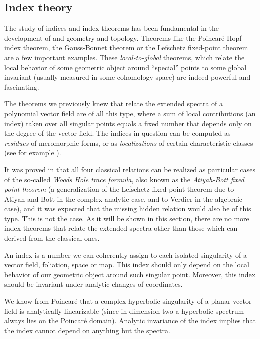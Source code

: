\documentclass[phd,tocprelim]{cornell}
\begin{document}
\subsection{Index theory}\label{subsec:indexTheory}

The study of indices and index theorems has been fundamental in the development of and geometry and topology. Theorems like the Poincar\'{e}-Hopf index theorem, the Gauss-Bonnet theorem or the Lefschetz fixed-point theorem are a few important examples. These \textit{local-to-global} theorems, which relate the local behavior of some geometric object around ``special'' points to some global invariant (usually measured in some cohomology space) are indeed powerful and fascinating.

The theorems we previously knew that relate the extended spectra of a polynomial vector field are of all this type, where a sum of local contributions (an index) taken over all singular points equals a fixed number that depends only on the degree of the vector field. The indices in question can be computed as \textit{residues} of meromorphic forms, or as \textit{localizations} of certain characteristic classes (see for example \cite{Suwa1998}).

It was proved in \cite{WoodsHole} that all four classical relations can be realized as particular cases of the so-called \textit{Woods Hole trace formula}, also known as the \textit{Atiyah-Bott fixed point theorem} (a generalization of the Lefschetz fixed point theorem due to Atiyah and Bott in the complex analytic case, and to Verdier in the algebraic case), and it was expected that the missing hidden relation would also be of this type. This is not the case. As it will be shown in this section, there are no more index theorems that relate the extended spectra other than those which can derived from the classical ones.

An index is a number we can coherently assign to each isolated singularity of a vector field, foliation, space or map. This index should only depend on the local behavior of our geometric object around such singular point. Moreover, this index should be invariant under analytic changes of coordinates.

We know from Poincaré that a complex hyperbolic singularity of a planar vector field is analytically linearizable (since in dimension two a hyperbolic spectrum always lies on the Poincar\'{e} domain). Analytic invariance of the index implies that the index cannot depend on anything but the spectra.
\end{document}
